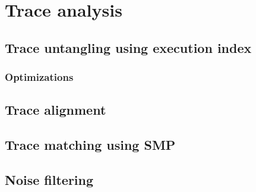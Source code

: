\chapter{Trace analysis}
\section{Trace untangling using execution index}
\subsection{Optimizations}

\section{Trace alignment}
\label{trace-alignment}

\section{Trace matching using SMP}
\section{Noise filtering}